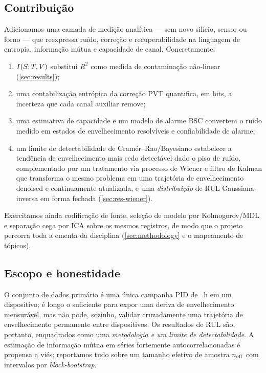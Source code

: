 \subsection{Contribuição}
Adicionamos uma camada de medição analítica --- sem novo silício, sensor ou
forno --- que reexpressa ruído, correção e recuperabilidade na linguagem de
entropia, informação mútua e capacidade de canal. Concretamente:
\begin{enumerate}
  \item $I\!\left(S ; T,V\right)$ substitui $R^2$ como medida de contaminação
        não-linear (\cref{sec:results});
  \item uma contabilização entrópica da correção PVT quantifica, em bits, a
        incerteza que cada canal auxiliar remove;
  \item uma estimativa de capacidade e um modelo de alarme BSC convertem o
        ruído medido em estados de envelhecimento resolvíveis e
        confiabilidade de alarme;
  \item um limite de detectabilidade de Cram\'er--Rao/Bayesiano estabelece a
        tendência de envelhecimento mais cedo detectável dado o piso de
        ruído, complementado por um tratamento via processo de Wiener e
        filtro de Kalman que transforma o mesmo problema em uma trajetória
        de envelhecimento denoised e continuamente atualizada, e uma
        \emph{distribuição} de RUL Gaussiana-inversa em forma fechada
        (\cref{sec:res-wiener}).
\end{enumerate}
Exercitamos ainda codificação de fonte, seleção de modelo por
Kolmogorov/MDL e separação cega por ICA sobre os mesmos registros, de modo
que o projeto percorra toda a ementa da disciplina (\cref{sec:methodology} e
o mapeamento de tópicos).

\subsection{Escopo e honestidade}
O conjunto de dados primário é uma única campanha PID de \valDurationHours~h
em um dispositivo; é longo o suficiente para expor uma deriva de
envelhecimento mensurável, mas não pode, sozinho, validar cruzadamente uma
trajetória de envelhecimento permanente entre dispositivos. Os resultados de
RUL são, portanto, enquadrados como uma \emph{metodologia e um limite de
detectabilidade}. A estimação de informação mútua em séries fortemente
autocorrelacionadas é propensa a viés; reportamos tudo sobre um tamanho
efetivo de amostra $n_{\mathrm{eff}}$ com intervalos por \emph{block-bootstrap}.
